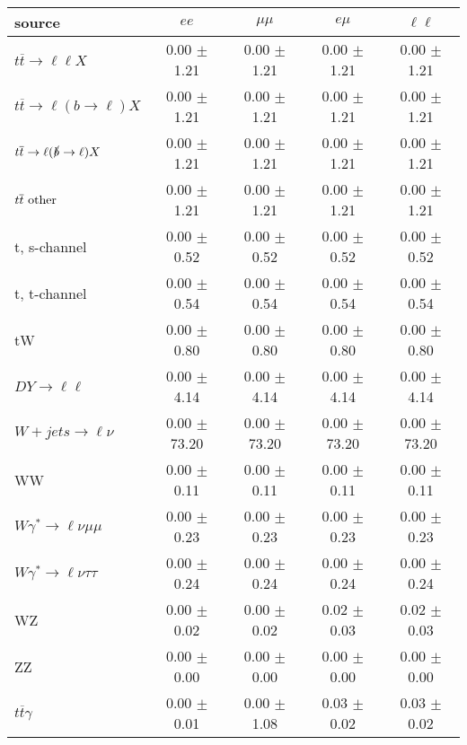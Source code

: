 \begin{tabular}{l|cccc} \hline\hline
source & $ee$ & $\mu\mu$ & $e\mu$ & $\ell\ell $ \\
\hline
$t\overline{t} \rightarrow \ell \ell X$ &  0.00 $\pm$  1.21 &  0.00 $\pm$  1.21 &  0.00 $\pm$  1.21 &  0.00 $\pm$  1.21 \\
$t\overline{t} \rightarrow \ell (b \rightarrow \ell) X$ &  0.00 $\pm$  1.21 &  0.00 $\pm$  1.21 &  0.00 $\pm$  1.21 &  0.00 $\pm$  1.21 \\
$t\overline{t} \rightarrow \ell (\slashed b \rightarrow \ell) X$ &  0.00 $\pm$  1.21 &  0.00 $\pm$  1.21 &  0.00 $\pm$  1.21 &  0.00 $\pm$  1.21 \\
        $t\overline{t}\ \rm{other}$ &  0.00 $\pm$  1.21 &  0.00 $\pm$  1.21 &  0.00 $\pm$  1.21 &  0.00 $\pm$  1.21 \\
\hline
                       t, s-channel &  0.00 $\pm$  0.52 &  0.00 $\pm$  0.52 &  0.00 $\pm$  0.52 &  0.00 $\pm$  0.52 \\
                       t, t-channel &  0.00 $\pm$  0.54 &  0.00 $\pm$  0.54 &  0.00 $\pm$  0.54 &  0.00 $\pm$  0.54 \\
                                 tW &  0.00 $\pm$  0.80 &  0.00 $\pm$  0.80 &  0.00 $\pm$  0.80 &  0.00 $\pm$  0.80 \\
\hline
         $DY \rightarrow \ell \ell$ &  0.00 $\pm$  4.14 &  0.00 $\pm$  4.14 &  0.00 $\pm$  4.14 &  0.00 $\pm$  4.14 \\
      $W+jets \rightarrow \ell \nu$ &  0.00 $\pm$ 73.20 &  0.00 $\pm$ 73.20 &  0.00 $\pm$ 73.20 &  0.00 $\pm$ 73.20 \\
                                 WW &  0.00 $\pm$  0.11 &  0.00 $\pm$  0.11 &  0.00 $\pm$  0.11 &  0.00 $\pm$  0.11 \\
\hline
$W\gamma^{*} \rightarrow \ell \nu \mu\mu$ &  0.00 $\pm$  0.23 &  0.00 $\pm$  0.23 &  0.00 $\pm$  0.23 &  0.00 $\pm$  0.23 \\
$W\gamma^{*} \rightarrow \ell \nu \tau\tau$ &  0.00 $\pm$  0.24 &  0.00 $\pm$  0.24 &  0.00 $\pm$  0.24 &  0.00 $\pm$  0.24 \\
                                 WZ &  0.00 $\pm$  0.02 &  0.00 $\pm$  0.02 &  0.02 $\pm$  0.03 &  0.02 $\pm$  0.03 \\
                                 ZZ &  0.00 $\pm$  0.00 &  0.00 $\pm$  0.00 &  0.00 $\pm$  0.00 &  0.00 $\pm$  0.00 \\
\hline
              $t\overline{t}\gamma$ &  0.00 $\pm$  0.01 &  0.00 $\pm$  1.08 &  0.03 $\pm$  0.02 &  0.03 $\pm$  0.02 \\

\end{tabular}
